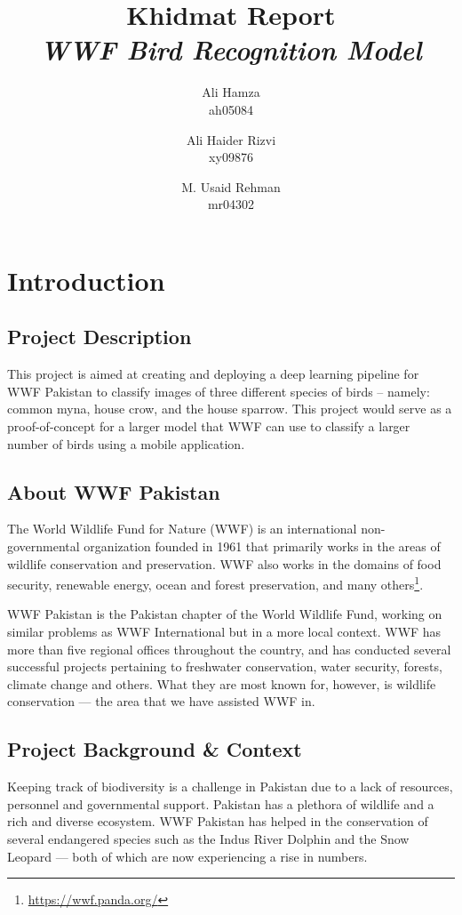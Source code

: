 \documentclass[11pt]{article}
\title{\Huge Khidmat Report\\
\textit{WWF Bird Recognition Model}}
\author{Ali Hamza\\ ah05084
  \and
  Ali Haider Rizvi\\ xy09876
  \and
  M. Usaid Rehman\\ mr04302
}
\date{}
\begin{document}
\maketitle
\newpage
\tableofcontents
\newpage
\section{Introduction}
\subsection{Project Description}
\setlength{\parindent}{3em}
This project is aimed at creating and deploying a deep learning pipeline for WWF Pakistan to classify images of 
three different species of birds -- namely: common myna, house crow, and the house sparrow. This project 
would serve as a proof-of-concept for a larger model that WWF can use to classify a larger number of birds 
using a mobile application.

\subsection{About WWF Pakistan}
The World Wildlife Fund for Nature (WWF) is an international non-governmental organization
founded in 1961 that primarily works in the areas of wildlife conservation and preservation.
WWF also works in the domains of food security, renewable energy, ocean and forest preservation, 
and many others\footnote{\url{https://wwf.panda.org/}}.

WWF Pakistan is the Pakistan chapter of the World Wildlife Fund, working on similar problems as 
WWF International but in a more local context. WWF has more than five regional offices 
throughout the country, and has conducted several successful 
projects pertaining to freshwater conservation, water security, forests, climate change and others.
What they are most known for, however, is wildlife conservation --- the area that we 
have assisted WWF in.

\subsection{Project Background \& Context}
Keeping track of biodiversity is a challenge in Pakistan due to a lack of resources, personnel 
and governmental support. Pakistan has a plethora of wildlife and a rich and diverse ecosystem. 
WWF Pakistan has helped in the conservation of several endangered species such as the 
Indus River Dolphin and the Snow Leopard --- both of which are now experiencing a rise in numbers. 
\end{document}
